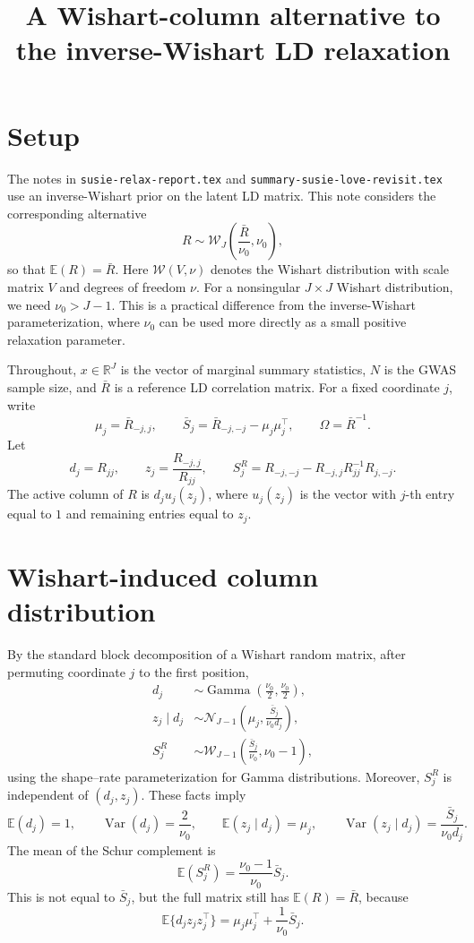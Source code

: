 \documentclass[11pt]{article}
\title{A Wishart-column alternative to the inverse-Wishart LD relaxation}
\author{}
\date{}
\newcommand{\Rbar}{\bar R}
\newcommand{\Sbar}{\bar S}
\newcommand{\E}{\mathbb E}
\newcommand{\Var}{\operatorname{Var}}
\newcommand{\Gam}{\operatorname{Gamma}}
\newcommand{\Wishart}{\mathcal W}
\newcommand{\Normal}{\mathcal N}
\begin{document}
\maketitle

\section{Setup}

The notes in \texttt{susie-relax-report.tex} and
\texttt{summary-susie-love-revisit.tex} use an inverse-Wishart prior on
the latent LD matrix. This note considers the corresponding alternative
\[
R\sim \Wishart_J\left(\frac{\Rbar}{\nu_0},\nu_0\right),
\]
so that \(\E(R)=\Rbar\). Here \(\Wishart(V,\nu)\) denotes the Wishart
distribution with scale matrix \(V\) and degrees of freedom \(\nu\).
For a nonsingular \(J\times J\) Wishart distribution, we need
\(\nu_0>J-1\). This is a practical difference from the inverse-Wishart
parameterization, where \(\nu_0\) can be used more directly as a small
positive relaxation parameter.

Throughout, \(x\in\mathbb R^J\) is the vector of marginal summary
statistics, \(N\) is the GWAS sample size, and \(\Rbar\) is a reference
LD correlation matrix. For a fixed coordinate \(j\), write
\[
\mu_j=\Rbar_{-j,j},\qquad
\Sbar_j=\Rbar_{-j,-j}-\mu_j\mu_j^\top,\qquad
\Omega=\Rbar^{-1}.
\]
Let
\[
d_j=R_{jj},\qquad
z_j=\frac{R_{-j,j}}{R_{jj}},\qquad
S_j^R=R_{-j,-j}-R_{-j,j}R_{jj}^{-1}R_{j,-j}.
\]
The active column of \(R\) is \(d_j u_j(z_j)\), where \(u_j(z_j)\) is the
vector with \(j\)-th entry equal to \(1\) and remaining entries equal to
\(z_j\).

\section{Wishart-induced column distribution}

By the standard block decomposition of a Wishart random matrix, after
permuting coordinate \(j\) to the first position,
\begin{align}
d_j
&\sim
\Gam\left(\frac{\nu_0}{2},\frac{\nu_0}{2}\right), \\
z_j\mid d_j
&\sim
\Normal_{J-1}\left(
\mu_j,\frac{\Sbar_j}{\nu_0 d_j}
\right), \\
S_j^R
&\sim
\Wishart_{J-1}\left(\frac{\Sbar_j}{\nu_0},\nu_0-1\right),
\end{align}
using the shape--rate parameterization for Gamma distributions. Moreover,
\(S_j^R\) is independent of \((d_j,z_j)\). These facts imply
\[
\E(d_j)=1,\qquad
\Var(d_j)=\frac{2}{\nu_0},\qquad
\E(z_j\mid d_j)=\mu_j,\qquad
\Var(z_j\mid d_j)=\frac{\Sbar_j}{\nu_0 d_j}.
\]
The mean of the Schur complement is
\[
\E(S_j^R)=\frac{\nu_0-1}{\nu_0}\Sbar_j.
\]
This is not equal to \(\Sbar_j\), but the full matrix still has
\(\E(R)=\Rbar\), because
\[
\E\{d_j z_jz_j^\top\}
=
\mu_j\mu_j^\top+\frac{1}{\nu_0}\Sbar_j.
\]
\end{document}
